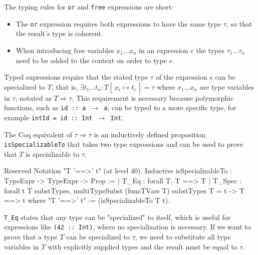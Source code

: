\documentclass[fleqn, abstract=on]{scrreprt}
\newcommand{\todo}[1]{\marginpar{\textbf{TODO:} #1}}
\newcommand{\coqinline}[1]{\texttt{#1}}
\begin{document}
\todo{Unterschiedliche Höhe...}\noindent
The typing rules for \texttt{or} and \texttt{free} expressions are short:
\begin{itemize}
	\item The \coqinline{or} expression requires both expressions to have the same type $\tau$, so that the result's type is coherent.
	\item When introducing free variables $x_1 \dots x_n$ in an expression $e$ the types $\tau_1 \dots \tau_n$ need to be added to the context on order to type $e$.
\end{itemize}
Typed expressions require that the stated type $\tau$ of the expression $e$ can be specialized to $T$, that is, $\exists t_1 \dots t_n: T[~\overline{x_i \mapsto t_i}~] = \tau$ where $x_1 \dots x_n$ are type variables in $\tau$, notated as $T \Rightarrow \tau$. This requirement is necessary because polymorphic functions, such as \texttt{id :: a $\rightarrow$ a}, can be typed to a more specific type, for example \mbox{\texttt{intId = id :: Int $\rightarrow$ Int}}.
\par
The Coq equivalent of $\tau \Rightarrow \tau$ is an inductively defined proposition \coqinline{isSpecializableTo} that takes two type expressions and can be used to prove that $T$ is specializable to $\tau$.
\begin{coqcode}
Reserved Notation "T '==>' t" (at level 40).
Inductive isSpecializableTo : TypeExpr -> TypeExpr -> Prop :=
  | T_Eq   : forall T, T  ==> T
  | T_Spec : forall t T substTypes,
               multiTypeSubst (funcTVars T) substTypes T = t ->
               T ==> t
where "T '==>' t" := (isSpecializableTo T t).
\end{coqcode}
\coqinline{T_Eq} states that any type can be "specialized" to itself, which is useful for expressions like \texttt{(42 :: Int)}, where no specialization is necessary. If we want to prove that a type $T$ can be specialized to $\tau$, we need to substitute all type variables in $T$ with explicitly supplied types and the result must be equal to $\tau$.
\end{document}
